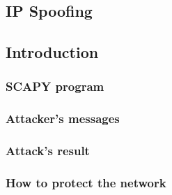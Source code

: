 \subsection{IP Spoofing}
\subsection{Introduction}


\subsubsection{SCAPY program}


\subsubsection{Attacker's messages}

\subsubsection{Attack's result}


\subsubsection{How to protect the network}
